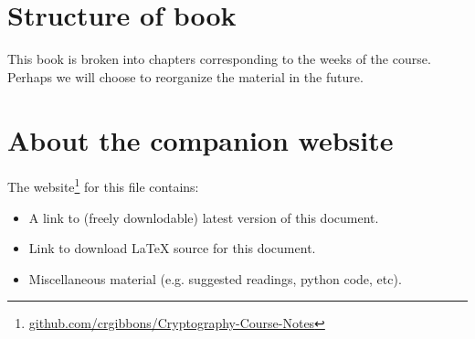 \section*{Structure of book}
This book is broken into chapters corresponding to the weeks of the course.  Perhaps we will choose to reorganize the material in the future.

\section*{About the companion website}
The website\footnote{\href{https://github.com/crgibbons/Cryptography-Course-Notes}{github.com/crgibbons/Cryptography-Course-Notes}} for this file contains:
\begin{itemize}
  \item A link to (freely downlodable) latest version of this document.
  \item Link to download LaTeX source for this document.
  \item Miscellaneous material (e.g. suggested readings, python code, etc).
\end{itemize}

